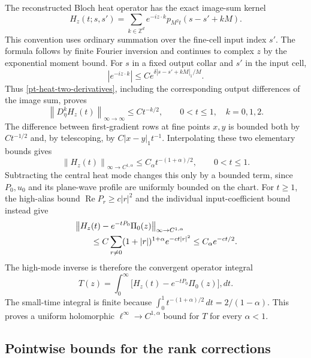 \documentclass[11pt]{article}
\newcommand{\norm}[1]{\left\lVert#1\right\rVert}
\begin{document}
The reconstructed Bloch heat operator has the exact image-sum kernel
\begin{equation}\label{pt-twisted-heat}
 H_z(t;s,s')=\sum_{k\in\mathbb Z^d}
             e^{-iz\cdot k}p_{M^2t}(s-s'+kM).
\end{equation}
This convention uses ordinary summation over the fine-cell input
index $s'$. The formula follows by finite Fourier inversion and
continues to complex $z$ by the exponential moment bound.
For $s$ in a fixed output collar and $s'$ in the input cell,
\[
 |e^{-iz\cdot k}|
       \le C e^{\delta|s-s'+kM|_1/M}.
\]
Thus \eqref{pt-heat-two-derivatives}, including the corresponding
output differences of the image sum, proves
\begin{equation}\label{pt-twisted-derivatives}
 \norm{D_\eta^kH_z(t)}_{\infty\to\infty}
       \le Ct^{-k/2},\qquad 0<t\le1,\quad k=0,1,2.
\end{equation}
The difference between first-gradient rows at fine points $x,y$ is
bounded both by $Ct^{-1/2}$ and, by telescoping, by
$C|x-y|_1t^{-1}$. Interpolating these two elementary bounds gives
\begin{equation}\label{pt-heat-holder}
 \norm{H_z(t)}_{\infty\to C^{1,\alpha}}
       \le C_\alpha t^{-(1+\alpha)/2},\qquad 0<t\le1.
\end{equation}
Subtracting the central heat mode changes this only by a bounded
term, since $P_0,u_0$ and its plane-wave profile are uniformly bounded
on the chart. For $t\ge1$, the high-alias bound
$\operatorname{Re}P_r\ge c|r|^2$ and the individual input-coefficient
bound instead give
\begin{align}
 &\norm{H_z(t)-e^{-tP_0}\Pi_0(z)}_{\infty\to C^{1,\alpha}}
       \notag\\
 &\qquad\le C\sum_{r\ne0}(1+|r|)^{1+\alpha}e^{-ct|r|^2}
       \le C_\alpha e^{-ct/2}.
       \label{pt-heat-large-time}
\end{align}
The high-mode inverse is therefore the convergent operator integral
\begin{equation}\label{pt-scalar-integral}
 T(z)=\int_0^\infty
             \bigl[H_z(t)-e^{-tP_0}\Pi_0(z)\bigr],dt.
\end{equation}
The small-time integral is finite because
$\int_0^1t^{-(1+\alpha)/2}\,dt=2/(1-\alpha)$.
This proves a uniform holomorphic
$\ell^\infty\to C^{1,\alpha}$ bound for $T$ for every $\alpha<1$.

\subsection{Pointwise bounds for the rank corrections}
\end{document}
